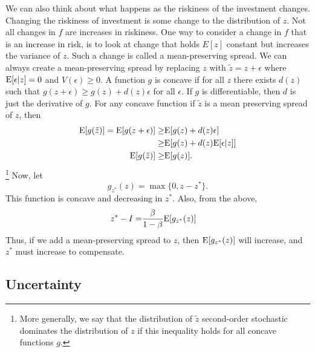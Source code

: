 \begin{example}
  We can also think about what happens as the riskiness of the
  investment changes. Changing the riskiness of investment is some
  change to the distribution of $z$.   
  Not all changes in $f$ are increases in riskiness. One way to
  consider a change in $f$ that is an increase in risk, is to look at
  change that holds $E[z]$ constant but increases the variance of
  $z$. Such a change is called a mean-preserving spread. We can always
  create a mean-preserving spread by replacing $z$ with $\tilde{z} = z
  + \epsilon$ where $\mathrm{E}[\epsilon|z] = 0$ and $V(\epsilon) \geq 0$. A
  function $g$ is concave if for all $z$ there exists $d(z)$ such that
  $g(z + \epsilon) \geq g(z) + d(z) \epsilon$ for all $\epsilon$. If
  $g$ is differentiable, then $d$ is just the derivative of $g$. For
  any concave function if $\tilde{z}$ is a mean preserving spread of
  $z$, then 
  \begin{align*}
    \mathrm{E}[g(\tilde{z})] = \mathrm{E}[g(z+\epsilon)] \geq & \mathrm{E}[g(z) + d(z) \epsilon] \\
    \geq & \mathrm{E}[g(z) + d(z) \mathrm{E}[\epsilon|z]] \\
    \mathrm{E}[g(\tilde{z})] \geq & \mathrm{E}[g(z)].
  \end{align*}\footnote{More generally, we say that the distribution
    of $\tilde{z}$ second-order stochastic dominates the distribution
    of $z$ if this inequality holds for all concave functions $g$.}
  Now, let 
  \[ g_{z^*}(z) = \max\{0, z - z^* \}. \] This function is concave and
  decreasing in $z^*$. Also, from the above,
  \begin{align*}
    z^* - I = & \frac{\beta}{1-\beta} \mathrm{E}[g_{z^*}(z)] 
  \end{align*}
  Thus, if we add a mean-preserving spread to $z$, then $\mathrm{E}[g_{z^*}(z)]$
  will increase, and $z^*$ must increase to compensate. 
\end{example}

\subsection{Uncertainty}

